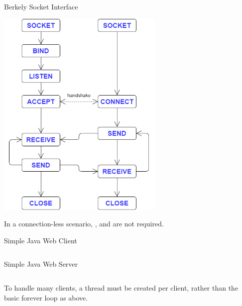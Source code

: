 \begin{definitionbox}{Berkely Socket Interface}
    \begin{center}\includegraphics[width=0.6\textwidth]{transport_layer/images/berkely interface.png}\end{center}
    In a connection-less scenario, ,  and  are not required.
\end{definitionbox}
\begin{examplebox}{Simple Java Web Client}
    \center\begin{minipage}[t]{0.9\textwidth}
        \inputminted{Java}{transport_layer/code/exampleTCPClient.java}
    \end{minipage}
\end{examplebox}
\begin{examplebox}{Simple Java Web Server}
    \begin{center}
        \begin{minipage}[t]{0.9\textwidth}
            \inputminted{Java}{transport_layer/code/exampleTCPServer.java}
        \end{minipage}
    \end{center}
    To handle many clients, a thread must be created per client, rather than the basic forever loop as above.
\end{examplebox}

